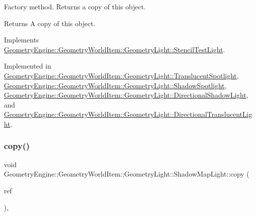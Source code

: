 Factory method. Returns a copy of this object. \begin{DoxyReturn}{Returns}
A copy of this object. 
\end{DoxyReturn}


Implements \mbox{\hyperlink{class_geometry_engine_1_1_geometry_world_item_1_1_geometry_light_1_1_stencil_test_light_a6434a228dc64537ff9984c82eaf8ab07}{Geometry\+Engine\+::\+Geometry\+World\+Item\+::\+Geometry\+Light\+::\+Stencil\+Test\+Light}}.



Implemented in \mbox{\hyperlink{class_geometry_engine_1_1_geometry_world_item_1_1_geometry_light_1_1_translucent_spotlight_a1d51bd602a6d25ba9189b2bb741bf4ef}{Geometry\+Engine\+::\+Geometry\+World\+Item\+::\+Geometry\+Light\+::\+Translucent\+Spotlight}}, \mbox{\hyperlink{class_geometry_engine_1_1_geometry_world_item_1_1_geometry_light_1_1_shadow_spotlight_a0ea8fd05d26f6e780d352168c28f940d}{Geometry\+Engine\+::\+Geometry\+World\+Item\+::\+Geometry\+Light\+::\+Shadow\+Spotlight}}, \mbox{\hyperlink{class_geometry_engine_1_1_geometry_world_item_1_1_geometry_light_1_1_directional_shadow_light_ae5016cad41a62c4c870a942acc3f9afe}{Geometry\+Engine\+::\+Geometry\+World\+Item\+::\+Geometry\+Light\+::\+Directional\+Shadow\+Light}}, and \mbox{\hyperlink{class_geometry_engine_1_1_geometry_world_item_1_1_geometry_light_1_1_directional_translucent_light_aca2d4b89caa4a3059922f49ecf81c8d5}{Geometry\+Engine\+::\+Geometry\+World\+Item\+::\+Geometry\+Light\+::\+Directional\+Translucent\+Light}}.

\mbox{\label{class_geometry_engine_1_1_geometry_world_item_1_1_geometry_light_1_1_shadow_map_light_a778fdb3b00c8b930e03ebbde77c9433c}} 
\subsubsection{\texorpdfstring{copy()}{copy()}}
{\footnotesize\ttfamily void Geometry\+Engine\+::\+Geometry\+World\+Item\+::\+Geometry\+Light\+::\+Shadow\+Map\+Light\+::copy (\begin{DoxyParamCaption}\item[{const \mbox{\hyperlink{class_geometry_engine_1_1_geometry_world_item_1_1_geometry_light_1_1_shadow_map_light}{Shadow\+Map\+Light}} \&}]{ref }\end{DoxyParamCaption})\hspace{0.3cm}{\ttfamily [protected]}, {\ttfamily [virtual]}}

